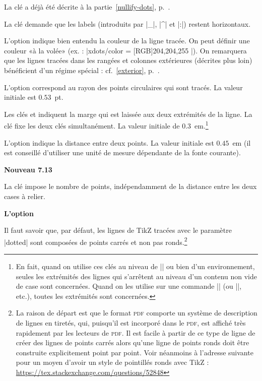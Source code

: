 \documentclass[dvipsnames]{article}
\begin{document}
\bigskip
La clé  a déjà été décrite à la
partie~\ref{nullify-dots}, p.~\pageref{nullify-dots}.

\bigskip
La clé  demande que les labels (introduits
par |_|, |^| et |:|) restent horizontaux.

\medskip
L'option  indique bien entendu la couleur de la ligne
tracée. On peut définir une couleur «à la volée» 
(ex. : |xdots/color = { [RGB]{204,204,255} }|). On remarquera que les
lignes tracées dans les rangées et colonnes extérieures (décrites plus loin)
bénéficient d'un régime spécial : cf.~\ref{exterior}, p.~\pageref{exterior}.

\medskip
L'option  correspond au rayon des points circulaires qui sont
tracés. La valeur initiale est $0.53$~pt.

\medskip
Les clés  et 
indiquent la marge qui est laissée aux deux extrémités de la ligne. La clé
 fixe les deux clés simultanément. La valeur initiale
de $0.3$~em.\footnote{En fait, quand on utilise ces clés au niveau de
  |\NiceMatrixOptions| ou bien d'un environnement, seules les extrémités des
  lignes qui s'arrêtent au niveau d'un contenu non vide de case sont concernées.
  Quand on les utilise sur une commande |\Cdots| (ou |\Vdots|, etc.), toutes les 
  extrémités sont concernées.}

\medskip
L'option  indique la distance entre deux points. La
valeur initiale est $0.45$~em (il est conseillé d'utiliser une unité de mesure
dépendante de la fonte courante).

\medskip
\colorbox{yellow!50}{\bfseries{Nouveau 7.13}}

\nobreak
\smallskip
La clé  impose le nombre de points,
indépendamment de la distance entre les deux cases à relier.

\medskip
\textbf{L'option }

\nobreak
\smallskip
Il faut savoir que, par défaut, les lignes de TikZ tracées avec le paramètre
|dotted| sont composées de points carrés et non pas ronds.\footnote{La raison de
  départ est que le format \textsc{pdf} comporte un système de description de
  lignes en tiretés, qui, puisqu'il est incorporé dans le \textsc{pdf}, est
  affiché très rapidement par les lecteurs de \textsc{pdf}. Il est facile à
  partir de ce type de ligne de créer des lignes de points carrés alors qu'une
  ligne de points ronds doit être construite explicitement point par point. Voir
néanmoins à l'adresse suivante pour un moyen d'avoir un style de pointillés
ronds avec TikZ :\newline \small
\url{https://tex.stackexchange.com/questions/52848}}
\end{document}
